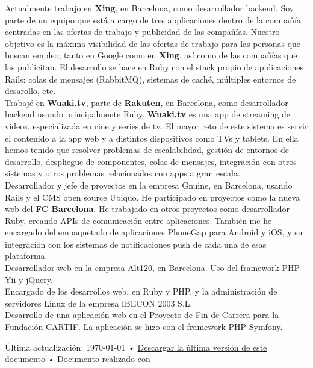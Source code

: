 \documentclass[10pt, a4paper]{article}
\begin{document}
\noindent{} Actualmente trabajo en \textbf{Xing}, en Barcelona, como desarrollador backend. Soy parte de un equipo que está a cargo de tres applicaciones dentro de la compañía centradas en las ofertas de trabajo y publicidad de las compañías. Nuestro objetivo es la máxima visibilidad de las ofertas de trabajo para las personas que buscan empleo, tanto en Google como en \textbf{Xing}, así como de las compañías que las publicitan. El desarrollo se hace en Ruby con el stack propio de applicaciones Rails: colas de mensajes (RabbitMQ), sistemas de caché, múltiples entornos de desarollo, etc.\\[.2cm]
\noindent{} Trabajé en \textbf{Wuaki.tv}, parte de \textbf{Rakuten}, en Barcelona, como desarrollador backend usando principalmente Ruby. \textbf{Wuaki.tv} es una app de streaming de videos, especializada en cine y series de tv. El mayor reto de este sistema es servir el contenido a la app web y a distintos dispositivos como TVs y tablets. En ella hemos tenido que resolver problemas de escalabilidad, gestión de entornos de desarrollo, despliegue de componentes, colas de mensajes, integración con otros sistemas y otros problemas relacionados con apps a gran escala.\\[.2cm]
\noindent{} Desarrollador y jefe de proyectos en la empresa Gnuine, en Barcelona, usando Rails y el CMS open source Ubiquo. He participado en proyectos como la nueva web del \textbf{FC Barcelona}. He trabajado en otros proyectos como desarrollador Ruby, creando APIs de comunicación entre aplicaciones. También me he encargado del empaquetado de aplicaciones PhoneGap para Android y iOS, y su integración con los sistemas de notificaciones push de cada una de esas plataforma.\\[.2cm]
\noindent{} Desarrollador web en la empresa Alt120, en Barcelona. Uso del framework PHP Yii y jQuery.\\[.2cm]
\noindent{} Encargado de los desarrollos web, en Ruby y PHP, y la administración de servidores Linux de la empresa IBECON 2003 S.L.\\[.2cm]
\noindent{} Desarrollo de una aplicación web en el Proyecto de Fin de Carrera para la Fundación CARTIF. La aplicación se hizo con el framework PHP Symfony.

\begin{center}
{\scriptsize  Última actualización: \today\- •\- \href{https://raw.github.com/jhbabon/cv/master/cv_es.pdf}{Descargar la última versión de este documento}\- •\- Documento realizado con \href{http://nitens.org/taraborelli/cvtex}{ \XeTeX }}
\end{center}
\end{document}
